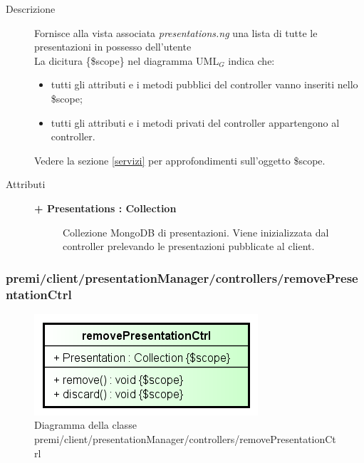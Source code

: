 \begin{description}
\item[Descrizione] \hfill
	Fornisce alla vista associata \textit{presentations.ng} una lista di tutte le presentazioni in possesso dell'utente
	\\ La dicitura \{\$scope\} nel diagramma UML$_G$ indica che:
\begin{itemize}
\item tutti gli attributi e i metodi pubblici del controller vanno inseriti nello \$scope;
\item tutti gli attributi e i metodi privati del controller appartengono al controller.
\end{itemize}
Vedere la sezione \ref{servizi} per approfondimenti sull'oggetto \$scope.
	
\item[Attributi] \hfill
	\begin{description}
		\item[\textbf{+ Presentations : Collection			}] \hfill
			Collezione MongoDB di presentazioni. Viene inizializzata dal controller prelevando le presentazioni pubblicate al client.
	\end{description}

\end{description}





\subsubsection{premi/client/presentationManager/controllers/removePresentationCtrl}
\begin{figure}[H]
\begin{center}
\includegraphics[scale=0.90]{img/diacla/removePresentationCtrl.png}
\caption{Diagramma della classe premi/client/presentationManager/controllers/removePresentationCtrl}
\end{center}
\end{figure}




